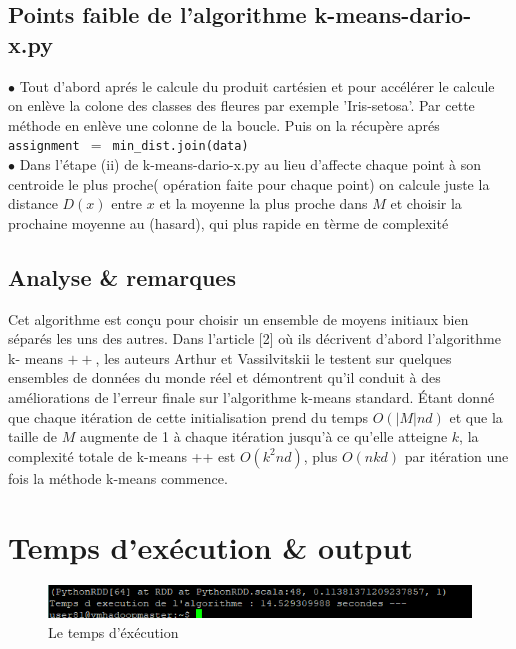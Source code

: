 \documentclass[12pt]{article}
\numberwithin{equation}{section}
\theoremstyle{plain}
\begin{document}
\subsection{Points faible de l'algorithme k-means-dario-x.py}
$\bullet$ Tout d'abord aprés le calcule du produit cartésien et pour accélérer le calcule on enlève la colone des classes des fleures par exemple 'Iris-setosa'. Par cette méthode en enlève une colonne de la boucle. Puis on la récupère aprés \texttt{assignment $=$ min\_dist.join(data)}\\
$\bullet$ Dans l'étape (ii) de k-means-dario-x.py au lieu d'affecte chaque point à son centroide le plus proche( opération faite pour chaque point) on calcule juste la distance $D (x)$ entre $x$ et la moyenne la plus proche dans $M$ et choisir la prochaine moyenne au (hasard), qui plus rapide en tèrme de complexité  
\subsection*{Analyse \& remarques}
Cet algorithme est conçu pour choisir un ensemble de moyens initiaux bien séparés les uns des autres. Dans l'article [2] où ils décrivent d'abord l'algorithme k- means $++$, les auteurs Arthur et Vassilvitskii le testent sur quelques ensembles de données du monde réel et démontrent qu'il conduit à des améliorations de l'erreur finale
sur l'algorithme k-means standard. Étant donné que chaque itération de cette initialisation prend du temps $O (|M|nd)$ et que la taille de $M$ augmente de 1 à chaque itération jusqu'à ce qu'elle atteigne $k$, la complexité totale de k-means ++ est $O (k^2 nd)$, plus $O (nkd)$ par itération une fois la  méthode k-means commence.

\section{Temps d'exécution \& output}


\begin{figure}[H]
\centering
\includegraphics{temp_ex}
\caption{Le temps d'éxécution
}
\end{figure}
\end{document}
